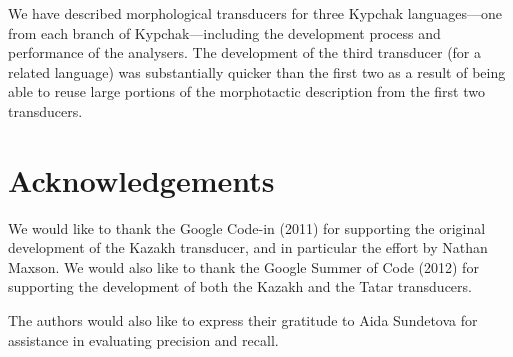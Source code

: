 \documentclass[a4paper,11pt,twocolumn]{article}
\begin{document}
We have described morphological transducers for three Kypchak languages---one from each branch of Kypchak---including the development process and performance of the analysers. The development of the third transducer (for a related language) was substantially quicker than the first two as a result of being able to reuse large portions of the morphotactic description from the first two transducers.

\section*{Acknowledgements}

We would like to thank the Google Code-in (2011) for supporting the original development 
of the Kazakh transducer, and in particular the effort by Nathan Maxson. We 
would also like to thank the Google Summer of Code (2012) for supporting the 
development of both the Kazakh and the Tatar transducers. 

The authors would also like to express their gratitude to Aida Sundetova 
for assistance in evaluating precision and recall.




\appendix 
\end{document}
